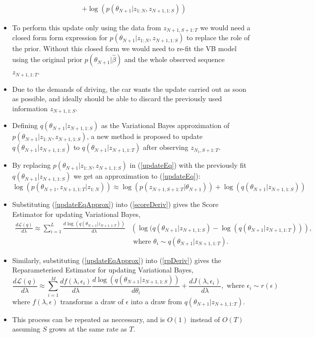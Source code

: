 \documentclass[12pt,a4paper]{article}\usepackage[]{graphicx}\usepackage[]{color}
\begin{document}
\begin{itemize}
\begin{align}
&+ \log(p(\theta_{N+1} | z_{1:N}, z_{N+1, 1:S})) \label{updateEq}
\end{align}
\item To perform this update only using the data from $z_{N+1, S+1:T}$ we would need a closed form form expression for $p(\theta_{N+1} | z_{1:N}, z_{N+1, 1:S})$ to replace the role of the prior. Without this closed form we would need to re-fit the VB model using the original prior $p(\theta_{N+1} | \hat{\beta})$ and the whole observed sequence $z_{N+1, 1:T}$.
\item Due to the demands of driving, the car wants the update carried out as soon as possible, and ideally should be able to discard the previously used information $z_{N+1, 1:S}$. 
\item Defining $q(\theta_{N+1} | z_{N+1, 1:S})$ as the Variational Bayes approximation of $p(\theta_{N+1} | z_{1:N}, z_{N+1, 1:S})$, a new method is proposed to update $q(\theta_{N+1} | z_{N+1, 1:S})$ to $q(\theta_{N+1} | z_{N+1, 1:T})$ after observing $z_{N_1, S+1:T}$.
\item By replacing $p(\theta_{N+1} | z_{1:N}, z_{N+1, 1:S})$ in (\ref{updateEq}) with the previously fit $q(\theta_{N+1} | z_{N+1, 1:S})$ we get an approximation to (\ref{updateEq}):
\begin{equation}
\label{updateEqApprox}
\log(p(\theta_{N+1}, z_{N+1, 1:T} | z_{1:N})) \approx \log(p(z_{N+1, S+1:T} | \theta_{N+1})) + \log(q(\theta_{N+1} | z_{N+1, 1:S}))
\end{equation}
\item Substituting (\ref{updateEqApprox}) into (\ref{scoreDeriv}) gives the Score Estimator for updating Variational Bayes, 
\begin{align}
\label{scoreUpdate}
\frac{d\mathcal{L}(q)}{d \lambda} \approx \sum_{i = 1}^L \frac{d \log(q(\theta_{N+1} | z_{N+1, 1:T}))}{d \lambda} &\left(\log(q(\theta_{N+1} | z_{N+1, 1:S}) - \log(q(\theta_{N+1} | z_{N+1, 1:T})) \right), \nonumber \\
& \mbox{ where } \theta_i \sim q(\theta_{N+1} | z_{N+1, 1:T}).
\end{align}
\item Similarly, substituting (\ref{updateEqApprox}) into (\ref{rpDeriv}) gives the Reparameterised Estimator for updating Variational Bayes,
\begin{equation}
\label{rpUpdate}
\frac{d\mathcal{L}(q)}{d \lambda} \approx \sum_{i = 1}^M \frac{d f(\lambda, \epsilon_i)}{d \lambda} \frac{d \log(q(\theta_{N+1} | z_{N+1, 1:S}))}{d \theta_i} + \frac{d J(\lambda, \epsilon_i)}{d \lambda}, \mbox{ where } \epsilon_i \sim r(\epsilon)
\end{equation}
where $f(\lambda, \epsilon)$ transforms a draw of $\epsilon$ into a draw from $q(\theta_{N+1} | z_{N+1, 1:T})$.
\item This process can be repeated as neccessary, and is $O(1)$ instead of $O(T)$ assuming $S$ grows at the same rate as $T$.
\end{itemize}
\end{document}
